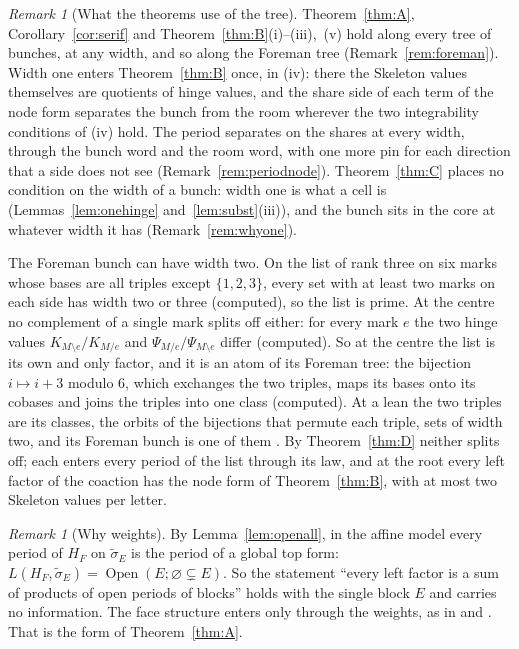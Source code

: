 \documentclass[11pt]{article}
\theoremstyle{plain}
\theoremstyle{definition}
\theoremstyle{remark}
\newtheorem{rem}[prop]{Remark}
\newcommand{\Open}{\operatorname{Open}}
\newcommand{\tsig}{\widetilde\sigma}
\begin{document}
\begin{rem}[What the theorems use of the tree]\label{rem:used}
Theorem~\ref{thm:A}, Corollary~\ref{cor:serif} and Theorem~\ref{thm:B}(i)--(iii),~(v) hold along every tree of bunches, at any width, and so along the Foreman tree (Remark~\ref{rem:foreman}). Width one enters Theorem~\ref{thm:B} once, in (iv): there the Skeleton values themselves are quotients of hinge values, and the share side of each term of the node form separates the bunch from the room wherever the two integrability conditions of (iv) hold. The period separates on the shares at every width, through the bunch word and the room word, with one more pin for each direction that a side does not see (Remark~\ref{rem:periodnode}). Theorem~\ref{thm:C} places no condition on the width of a bunch: width one is what a cell is (Lemmas~\ref{lem:onehinge} and~\ref{lem:subst}(iii)), and the bunch sits in the core at whatever width it has (Remark~\ref{rem:whyone}).

The Foreman bunch can have width two. On the list of rank three on six marks whose bases are all triples except $\{1,2,3\}$, every set with at least two marks on each side has width two or three (computed), so the list is prime. At the centre no complement of a single mark splits off either: for every mark $e$ the two hinge values $K_{M\setminus e}/K_{M/e}$ and $\Psi_{M/e}/\Psi_{M\setminus e}$ differ (computed). So at the centre the list is its own and only factor, and it is an atom of its Foreman tree: the bijection $i\mapsto i+3$ modulo $6$, which exchanges the two triples, maps its bases onto its cobases and joins the triples into one class (computed). At a lean the two triples are its classes, the orbits of the bijections that permute each triple, sets of width two, and its Foreman bunch is one of them \cite[Def.~13.6, p.~78]{F}. By Theorem~\ref{thm:D} neither splits off; each enters every period of the list through its law, and at the root every left factor of the coaction has the node form of Theorem~\ref{thm:B}, with at most two Skeleton values per letter.
\end{rem}

\begin{rem}[Why weights]
By Lemma~\ref{lem:openall}, in the affine model every period of $H_F$ on $\tsig_E$ is the period of a global top form: $L(H_F,\tsig_E)=\Open(E;\varnothing\subsetneq E)$. So the statement ``every left factor is a sum of products of open periods of blocks'' holds with the single block $E$ and carries no information. The face structure enters only through the weights, as in \cite[Prop.~10.7]{B1} and \cite[Thm.~8.11]{B2}. That is the form of Theorem~\ref{thm:A}.
\end{rem}
\end{document}
